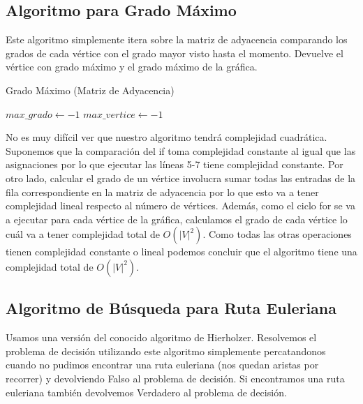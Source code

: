 \documentclass[11pt]{article}
\begin{document}
\subsection*{Algoritmo para Grado Máximo}
Este algoritmo simplemente itera sobre la matriz de adyacencia comparando los grados de cada vértice
con el grado mayor visto hasta el momento. Devuelve el vértice con grado máximo y el grado máximo de la
gráfica.

\begin{algorithm}[H]
  \caption{Grado Máximo (Matriz de Adyacencia)}
  
  \DontPrintSemicolon
  \BlankLine
  
  $max\_grado \leftarrow -1$ 
  $max\_vertice \leftarrow -1$ 
  

  \;
\end{algorithm}

No es muy difícil ver que nuestro algoritmo tendrá complejidad cuadrática.
Suponemos que la comparación del if toma complejidad constante al igual que las
asignaciones por lo que ejecutar las líneas 5-7 tiene complejidad constante. Por
otro lado, calcular el grado de un vértice involucra sumar todas las entradas de
la fila correspondiente en la matriz de adyacencia por lo que esto va a tener
complejidad lineal respecto al número de vértices. Además, como el ciclo for se
va a ejecutar para cada vértice de la gráfica, calculamos el grado de cada vértice
lo cuál va a tener complejidad total de $O(|V|^2)$. Como todas las otras operaciones
tienen complejidad constante o lineal podemos concluir que el algoritmo tiene una
complejidad total de $O(|V|^2)$.

\subsection*{Algoritmo de Búsqueda para Ruta Euleriana}
Usamos una versión del conocido algoritmo de Hierholzer. Resolvemos el problema de decisión
utilizando este algoritmo simplemente percatandonos cuando no pudimos encontrar una ruta
euleriana (nos quedan aristas por recorrer) y devolviendo Falso al problema de decisión. Si
encontramos una ruta euleriana también devolvemos Verdadero al problema de decisión.
\end{document}
